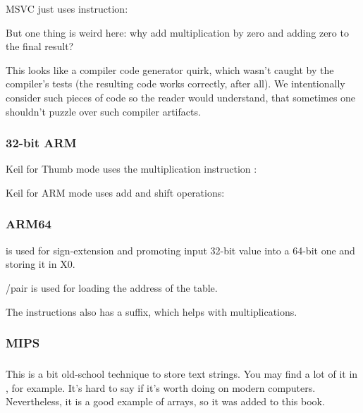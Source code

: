 \NonOptimizing MSVC just uses \IMUL instruction:



\myindex{\CompilerAnomaly}
\label{MSVC2013_anomaly}

But one thing is weird here: why add multiplication by zero and adding zero to the final result?

This looks like a compiler code generator quirk, which wasn't caught by the compiler's tests
(the resulting code works correctly, after all).
%
We intentionally consider such pieces of code so the reader would understand, 
that sometimes one shouldn't puzzle over such compiler artifacts.

\subsubsection{32-bit ARM}

\Optimizing Keil 
for Thumb mode uses the multiplication instruction :



\Optimizing Keil for ARM mode uses add and shift operations:



\subsubsection{ARM64}




 is used for sign-extension and promoting input 32-bit value into a 64-bit one and storing it in X0.

\ADRP/\ADD pair is used for loading the address of the table.

The \ADD instructions also has a \LSL suffix, which helps with multiplications.

\subsubsection{MIPS}


\subsubsection{\Conclusion{}}

This is a bit old-school technique to store text strings.
You may find a lot of it in \oracle, for example.
It's hard to say if it's worth doing on modern computers.
Nevertheless, it is a good example of arrays, so it was added to this book.

